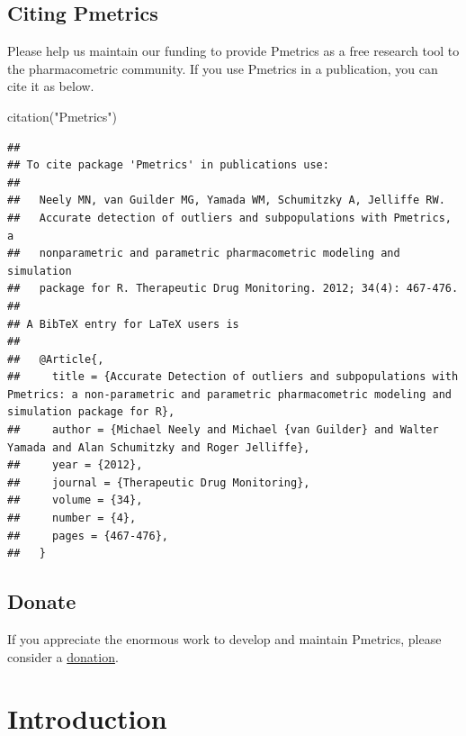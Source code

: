 \documentclass[
]{book}
\newenvironment{Shaded}{\begin{snugshade}}{\end{snugshade}}
\newcommand{\FunctionTok}[1]{\textcolor[rgb]{0.00,0.00,0.00}{#1}}
\newcommand{\NormalTok}[1]{#1}
\newcommand{\StringTok}[1]{\textcolor[rgb]{0.31,0.60,0.02}{#1}}
\begin{document}
\hypertarget{citing-pmetrics}{%
\section{Citing Pmetrics}\label{citing-pmetrics}}

Please help us maintain our funding to provide Pmetrics as a free
research tool to the pharmacometric community. If you use Pmetrics in a
publication, you can cite it as below.

\begin{Shaded}
\begin{Highlighting}[]
\FunctionTok{citation}\NormalTok{(}\StringTok{"Pmetrics"}\NormalTok{)}
\end{Highlighting}
\end{Shaded}

\begin{verbatim}
## 
## To cite package 'Pmetrics' in publications use:
## 
##   Neely MN, van Guilder MG, Yamada WM, Schumitzky A, Jelliffe RW.
##   Accurate detection of outliers and subpopulations with Pmetrics, a
##   nonparametric and parametric pharmacometric modeling and simulation
##   package for R. Therapeutic Drug Monitoring. 2012; 34(4): 467-476.
## 
## A BibTeX entry for LaTeX users is
## 
##   @Article{,
##     title = {Accurate Detection of outliers and subpopulations with Pmetrics: a non-parametric and parametric pharmacometric modeling and simulation package for R},
##     author = {Michael Neely and Michael {van Guilder} and Walter Yamada and Alan Schumitzky and Roger Jelliffe},
##     year = {2012},
##     journal = {Therapeutic Drug Monitoring},
##     volume = {34},
##     number = {4},
##     pages = {467-476},
##   }
\end{verbatim}

\hypertarget{donate}{%
\section{Donate}\label{donate}}

If you appreciate the enormous work to develop and maintain Pmetrics,
please consider a \href{https://www.paypal.com/donate?token=3aF-w2c7Dw35BWYefFIX1QUD9j7Uu2J3KGkmh7vWF_A8ifjKc8E1Bp05NmDCH__6GwB49bXYOp_tKNpw}{donation}.

\hypertarget{introduction}{%
\chapter{Introduction}\label{introduction}}
\end{document}
